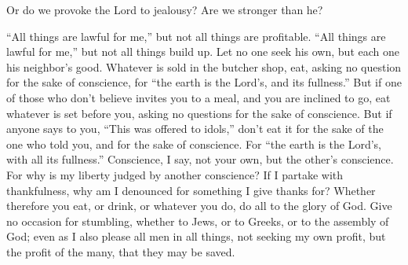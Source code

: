 {Or do we provoke the Lord to jealousy? Are we stronger than he?
\par }{\PP {}“All things are lawful for me,” but not all things are profitable. “All things are lawful for me,” but not all things build up.
Let no one seek his own, but each one his neighbor’s good.
Whatever is sold in the butcher shop, eat, asking no question for the sake of conscience,
for “the earth is the Lord’s, and its fullness.”
But if one of those who don’t believe invites you to a meal, and you are inclined to go, eat whatever is set before you, asking no questions for the sake of conscience.
But if anyone says to you, “This was offered to idols,” don’t eat it for the sake of the one who told you, and for the sake of conscience. For “the earth is the Lord’s, with all its fullness.”
Conscience, I say, not your own, but the other’s conscience. For why is my liberty judged by another conscience?
If I partake with thankfulness, why am I denounced for something I give thanks for?
Whether therefore you eat, or drink, or whatever you do, do all to the glory of God.
Give no occasion for stumbling, whether to Jews, or to Greeks, or to the assembly of God;
even as I also please all men in all things, not seeking my own profit, but the profit of the many, that they may be saved.

}

